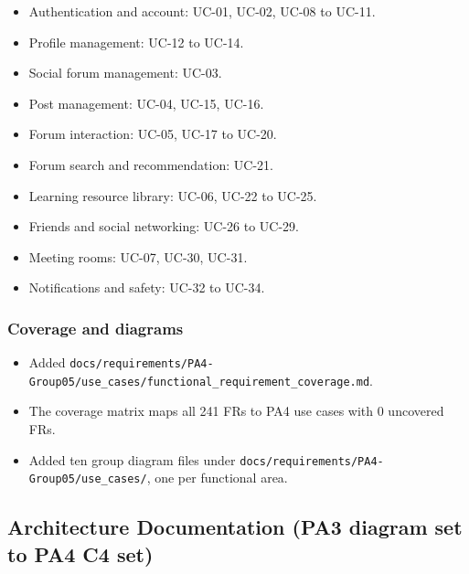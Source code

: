 \documentclass[12pt]{article}
\begin{document}
\begin{itemize}
\item Authentication and account: UC-01, UC-02, UC-08 to UC-11.
\item Profile management: UC-12 to UC-14.
\item Social forum management: UC-03.
\item Post management: UC-04, UC-15, UC-16.
\item Forum interaction: UC-05, UC-17 to UC-20.
\item Forum search and recommendation: UC-21.
\item Learning resource library: UC-06, UC-22 to UC-25.
\item Friends and social networking: UC-26 to UC-29.
\item Meeting rooms: UC-07, UC-30, UC-31.
\item Notifications and safety: UC-32 to UC-34.
\end{itemize}
\par\medskip

\hypertarget{sec:coverage-and-diagrams}{}
\subsubsection*{Coverage and diagrams}
\par\medskip

\begin{itemize}
\item Added \texttt{docs/requirements/PA4-Group05/use\_cases/functional\_requirement\_coverage.md}.
\item The coverage matrix maps all 241 FRs to PA4 use cases with 0 uncovered FRs.
\item Added ten group diagram files under \texttt{docs/requirements/PA4-Group05/use\_cases/}, one per functional area.
\end{itemize}
\par\medskip

\hypertarget{sec:architecture-documentation-pa3-diagram-set-to-pa4-c4-set}{}
\subsection*{Architecture Documentation (PA3 diagram set to PA4 C4 set)}
\par\medskip
\end{document}
